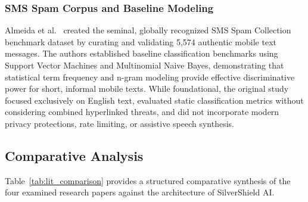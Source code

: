 \documentclass[conference]{IEEEtran}
\begin{document}
\subsubsection{SMS Spam Corpus and Baseline Modeling}
Almeida et al.~\cite{almeida2011contributions} created the seminal, globally recognized SMS Spam Collection benchmark dataset by curating and validating 5,574 authentic mobile text messages. The authors established baseline classification benchmarks using Support Vector Machines and Multinomial Naive Bayes, demonstrating that statistical term frequency and n-gram modeling provide effective discriminative power for short, informal mobile texts. While foundational, the original study focused exclusively on English text, evaluated static classification metrics without considering combined hyperlinked threats, and did not incorporate modern privacy protections, rate limiting, or assistive speech synthesis.

\subsection{Comparative Analysis}
Table~\ref{tab:lit_comparison} provides a structured comparative synthesis of the four examined research papers against the architecture of SilverShield AI.
\end{document}
